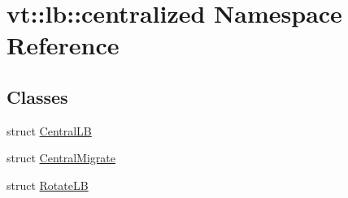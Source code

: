 \hypertarget{namespacevt_1_1lb_1_1centralized}{}\section{vt\+:\+:lb\+:\+:centralized Namespace Reference}
\label{namespacevt_1_1lb_1_1centralized}
\subsection*{Classes}
\begin{DoxyCompactItemize}
\item 
struct \hyperlink{structvt_1_1lb_1_1centralized_1_1_central_l_b}{Central\+LB}
\item 
struct \hyperlink{structvt_1_1lb_1_1centralized_1_1_central_migrate}{Central\+Migrate}
\item 
struct \hyperlink{structvt_1_1lb_1_1centralized_1_1_rotate_l_b}{Rotate\+LB}
\end{DoxyCompactItemize}
